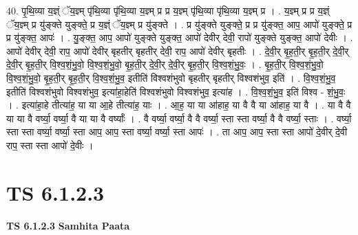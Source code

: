 \documentclass[17pt]{extarticle}
\begin{document}
40. पृ॒थि॒व्या य॒ज्ञ्ं ॅय॒ज्ञ्म् पृ॑थि॒व्या पृ॑थि॒व्या य॒ज्ञ्म् प्र प्र य॒ज्ञ्म् पृ॑थि॒व्या पृ॑थि॒व्या य॒ज्ञ्म् प्र । . य॒ज्ञ्म् प्र प्र य॒ज्ञ्ं ॅय॒ज्ञ्म् प्र यु॑ङ्क्ते युङ्क्ते॒ प्र य॒ज्ञ्ं ॅय॒ज्ञ्म् प्र यु॑ङ्क्ते । . प्र यु॑ङ्क्ते युङ्क्ते॒ प्र प्र यु॑ङ्क्त॒ आप॒ आपो॑ युङ्क्ते॒ प्र प्र यु॑ङ्क्त॒ आपः॑ । . यु॒ङ्क्त॒ आप॒ आपो॑ युङ्क्ते युङ्क्त॒ आपो॑ देवीर् देवी॒ रापो॑ युङ्क्ते युङ्क्त॒ आपो॑ देवीः । . आपो॑ देवीर् देवी॒ राप॒ आपो॑ देवीर् बृहतीर् बृहतीर् देवी॒ राप॒ आपो॑ देवीर् बृहतीः । . दे॒वी॒र् बृ॒ह॒ती॒र् बृ॒ह॒ती॒र् दे॒वी॒र् दे॒वी॒र् बृ॒ह॒ती॒र् वि॒श्व॒शं॒भु॒वो॒ वि॒श्व॒शं॒भु॒वो॒ बृ॒ह॒ती॒र् दे॒वी॒र् दे॒वी॒र् बृ॒ह॒ती॒र् वि॒श्व॒शं॒भु॒वः॒ । . बृ॒ह॒ती॒र् वि॒श्व॒शं॒भु॒वो॒ वि॒श्व॒शं॒भु॒वो॒ बृ॒ह॒ती॒र् बृ॒ह॒ती॒र् वि॒श्व॒शं॒भु॒व॒ इतीति॑ विश्वशंभुवो बृहतीर् बृहतीर् विश्वशंभुव॒ इति॑ । . वि॒श्व॒शं॒भु॒व॒ इतीति॑ विश्वशंभुवो विश्वशंभुव॒ इत्या॑हा॒हेति॑ विश्वशंभुवो विश्वशंभुव॒ इत्या॑ह । . वि॒श्व॒शं॒भु॒व॒ इति॑ विश्व - शं॒भु॒वः॒ । . इत्या॑हा॒हे तीत्या॑ह॒ या या आ॒हे तीत्या॑ह॒ याः । . आ॒ह॒ या या आ॑हाह॒ या वै वै या आ॑हाह॒ या वै । . या वै वै या या वै वर्ष्या॒ वर्ष्या॒ वै या या वै वर्ष्याः᳚ । . वै वर्ष्या॒ वर्ष्या॒ वै वै वर्ष्या॒ स्ता स्ता वर्ष्या॒ वै वै वर्ष्या॒ स्ताः । . वर्ष्या॒ स्ता स्ता वर्ष्या॒ वर्ष्या॒ स्ता आप॒ आप॒ स्ता वर्ष्या॒ वर्ष्या॒ स्ता आपः॑ । . ता आप॒ आप॒ स्ता स्ता आपो॑ दे॒वीर् दे॒वी राप॒ स्ता स्ता आपो॑ दे॒वीः । \newline
\pagebreak
{}

\section{ TS 6.1.2.3 }

\textbf{TS 6.1.2.3 } \newline
\textbf{Samhita Paata} \newline
\end{document}
